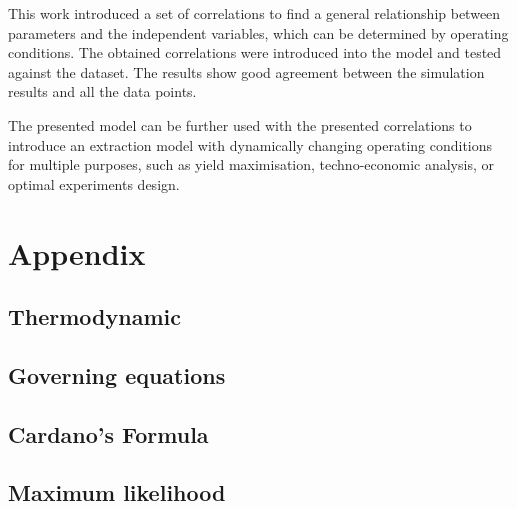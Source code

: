 \documentclass[a4paper,fleqn]{cas-dc}
\begin{document}
This work introduced a set of correlations to find a general relationship between parameters and the independent variables, which can be determined by operating conditions. The obtained correlations were introduced into the model and tested against the dataset. The results show good agreement between the simulation results and all the data points.

The presented model can be further used with the presented correlations to introduce an extraction model with dynamically changing operating conditions for multiple purposes, such as yield maximisation, techno-economic analysis, or optimal experiments design.

%



\clearpage \appendix \label{appendix}
\section{Appendix} 
\subsection{Thermodynamic}


\subsection{Governing equations}


\subsection{Cardano's Formula} \label{CH: Cardano}


%

\subsection{Maximum likelihood} \label{CH: ML}

\end{document}
